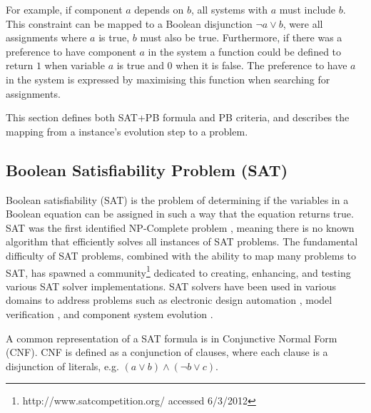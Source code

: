 For example, if component $a$ depends on $b$, all systems with $a$ must include $b$.
This constraint can be mapped to a Boolean disjunction $\neg a \vee b$, were all assignments where $a$ is true, $b$ must also be true.
Furthermore, if there was a preference to have component $a$ in the system a function could be defined to return $1$ when variable $a$ is true and $0$ when it is false.
The preference to have $a$ in the system is expressed by maximising this function when searching for assignments.

This section defines both SAT+PB formula and PB criteria, and describes the mapping from a \modelname instance's evolution step to a \modelimpl problem.

\subsection{Boolean Satisfiability Problem (SAT)}
Boolean satisfiability (SAT) is the problem of determining if the variables in a Boolean equation can be assigned in such a way that the equation returns true.
SAT was the first identified NP-Complete problem \citep{cook1971}, meaning there is no known algorithm that efficiently solves all instances of SAT problems.
The fundamental difficulty of SAT problems, 
combined with the ability to map many problems to SAT, has spawned a community\footnote{http://www.satcompetition.org/ accessed 6/3/2012} 
dedicated to creating, enhancing, and testing various SAT solver implementations. 
SAT solvers have been used in various domains to address problems such as electronic design automation \citep{Marques-Silva2000}, 
model verification \citep{dennis2006}, and component system evolution \citep{leBerre2010}.

A common representation of a SAT formula is in Conjunctive Normal Form (CNF).
CNF is defined as a conjunction of clauses, 
where each clause is a disjunction of literals, e.g. $(a \vee b) \wedge (\neg b \vee c)$.

